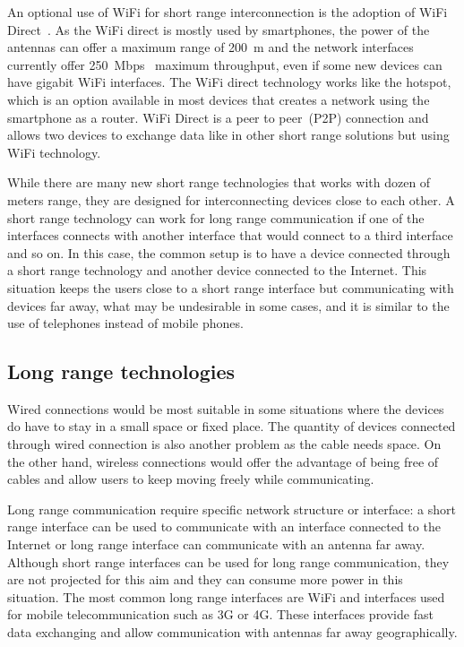 An optional use of WiFi for short range interconnection is the adoption of WiFi Direct~\citep{Alliance2010wifii}.
As the WiFi direct is mostly used by smartphones, the power of the antennas can offer a maximum range of 200~m and the network interfaces currently offer 250~Mbps~\citep{Feng2014d2d} maximum throughput, even if some new devices can have gigabit WiFi interfaces.
The WiFi direct technology works like the hotspot, which is an option available in most devices that creates a network using the smartphone as a router.
WiFi Direct is a peer to peer~(P2P) connection and allows two devices to exchange data like in other short range solutions but using WiFi technology.

While there are many new short range technologies that works with dozen of meters range, they are designed for interconnecting devices close to each other.
A short range technology can work for long range communication if one of the interfaces connects with another interface that would connect to a third interface and so on.
In this case, the common setup is to have a device connected through a short range technology and another device connected to the Internet.
This situation keeps the users close to a short range interface but communicating with devices far away, what may be undesirable in some cases, and it is similar to the use of telephones instead of mobile phones. 

\subsection*{Long range technologies} 

Wired connections would be most suitable in some situations where the devices do have to stay in a small space or fixed place.
The quantity of devices connected through wired connection is also another problem as the cable needs space.
On the other hand, wireless connections would offer the advantage of being free of cables and allow users to keep moving freely while communicating.

Long range communication require specific network structure or interface: a short range interface can be used to communicate with an interface connected to the Internet or long range interface can communicate with an antenna far away.
Although short range interfaces can be used for long range communication, they are not projected for this aim and they can consume more power in this situation.
The most common long range interfaces are WiFi and interfaces used for mobile telecommunication such as 3G or 4G.
These interfaces provide fast data exchanging and allow communication with antennas far away geographically. 


